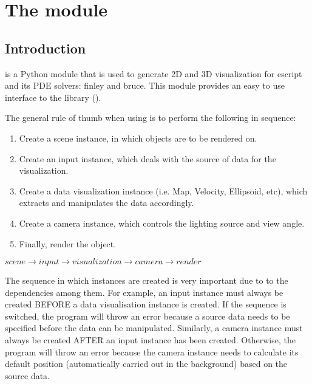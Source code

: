 \chapter{The module \pyvisi}
\label{PYVISI CHAP}

\section{Introduction}
\pyvisi is a Python module that is used to generate 2D and 3D visualization 
for escript and its PDE solvers: finley and bruce. This module provides 
an easy to use interface to the \VTK library (\VTKUrl).  

The general rule of thumb when using \pyvisi is to perform the following 
in sequence:

\begin{enumerate}
\item Create a scene instance, in which objects are to be rendered on.
\item Create an input instance, which deals with the source of data for 
the visualization.
\item Create a data visualization instance (i.e. Map, Velocity, Ellipsoid, 
etc), which extracts and manipulates the data accordingly.
\item Create a camera instance, which controls the lighting 
source and view angle.
\item Finally, render the object.
\end{enumerate}
\begin{center}
\begin{math}
scene \rightarrow input \rightarrow visualization \rightarrow 
camera \rightarrow render
\end{math}
\end{center}

The sequence in which instances are created is very important due to
to the dependencies among them. For example, an input instance must 
always be created BEFORE a data visualisation instance is created. 
If the sequence is switched, the program will throw an error because a 
source data needs to be specified before the data can be 
manipulated. Similarly, a camera instance must always be created
AFTER an input instance has been created. Otherwise, the program will throw 
an error because the camera instance needs to calculate its 
default position (automatically carried out in the background) based on 
the source data. 


